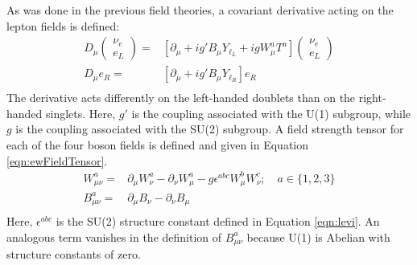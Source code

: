 As was done in the previous field theories, a covariant derivative acting on the lepton fields is defined:
\begin{equation}\begin{split}\label{eqn:ewCovDeriv}
        D_\mu\begin{pmatrix}\nu_e\\e_L\end{pmatrix}=&[\partial_\mu+ig'B_\mu Y_{\ell_L}+igW^a_\mu T^a]\begin{pmatrix}\nu_e\\e_L\end{pmatrix} \\
        D_\mu e_R=&[\partial_\mu+ig'B_\mu Y_{\ell_R}]e_R \\
\end{split}\end{equation} 
The derivative acts differently on the left-handed doublets than on the right-handed singlets.
Here, $g'$ is the coupling associated with the U(1) subgroup, while $g$ is the coupling associated with the SU(2) subgroup.
A field strength tensor for each of the four boson fields is defined and given in Equation \ref{eqn:ewFieldTensor}.
\begin{equation}\begin{split}\label{eqn:ewFieldTensor}
W^a_{\mu\nu} =& \partial_\mu W^a_\nu-\partial_\nu W^a_\mu-g\epsilon^{abc}W^b_\mu W^c_\nu; \quad a\in\{1,2,3\} \\
B^a_{\mu\nu} =& \partial_\mu B_\nu-\partial_\nu B_\mu \\
\end{split}\end{equation} 
Here, $\epsilon^{abc}$ is the SU(2) structure constant defined in Equation \ref{eqn:levi}.
An analogous term vanishes in the definition of $B^a_{\mu\nu}$ because U(1) is Abelian with structure constants of zero.

